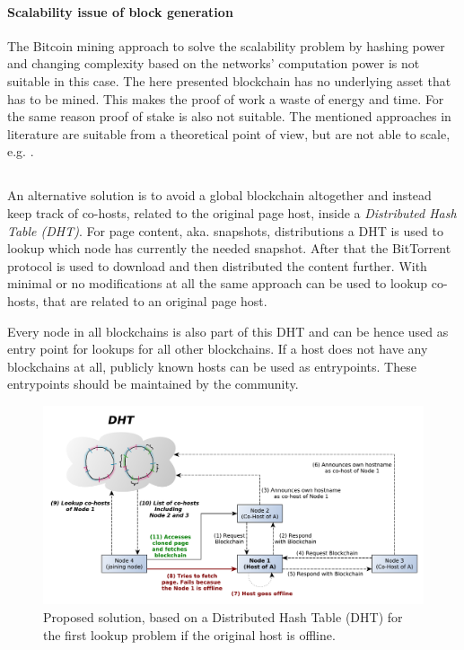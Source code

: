 \paragraph{Scalability issue of block generation}
The Bitcoin mining approach to
solve the scalability problem by hashing power and changing complexity based
on the networks' computation power is not suitable in this case. The here
presented blockchain has no underlying asset that has to be mined. This makes
the proof of work a waste of energy and time. For the same reason proof
of stake is also not suitable. The mentioned approaches in literature are
suitable from a theoretical point of view, but are not able to scale,
e.g.  \cite{castro1999practical}.

\subsection{\color{green}{[ACCEPTED] Solution 2: Distributed Hash Table lookup}}

An alternative solution is to avoid a global blockchain altogether and instead
keep track of co-hosts, related to the original page host, inside a
\textit{Distributed Hash Table (DHT)}. For page content, aka. snapshots,
distributions a DHT is used to lookup which node has currently the needed
snapshot. After that the BitTorrent protocol is used to download and then
distributed the content further. With minimal or no modifications at all the
same approach can be used to lookup co-hosts, that are related to an original
page host.

Every node in all blockchains is also part of this DHT and can be hence used as
entry point for lookups for all other blockchains. If a host does not have any
blockchains at all, publicly known hosts can be used as entrypoints. These
entrypoints should be maintained by the community.

\begin{figure}[htp]
\includegraphics[width=\textwidth]{pictures/dht_solution_to_first_lookup.pdf}
\caption{Proposed solution, based on a Distributed Hash Table (DHT) for the
first lookup problem if the original host is offline.}
\label{fig:dht_solution}
\end{figure}

